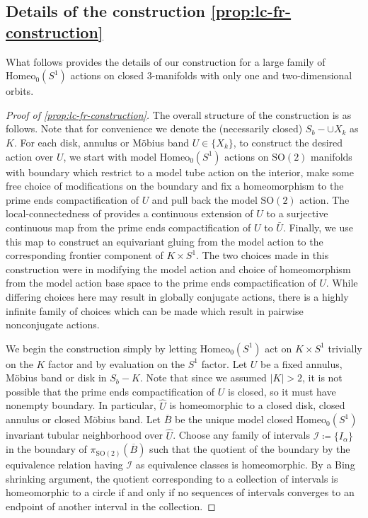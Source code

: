 \documentclass[10pt, oneside]{article}
\newcommand{\SO}[1][2]{\text{SO}(#1)}
\newcommand{\homeo}[1][S^1]{\text{Homeo}_0(#1)}
\newcommand{\cl}[1]{\overline{#1}}
\theoremstyle{definition}
\theoremstyle{definition}
\begin{document}
\subsection{Details of the construction \texorpdfstring{\cref{prop:lc-fr-construction}}{Proposition \ref*{prop:lc-fr-construction}}}\label{subsec:details-of-construction}
What follows provides the details of our construction for a large family of $\homeo$ actions on closed 3-manifolds with only one and two-dimensional orbits.
\begin{proof}[Proof of \cref{prop:lc-fr-construction}]
    The overall structure of the construction is as follows. Note that for convenience we denote the (necessarily closed) $S_b - \cup X_k$ as $K$.
    For each disk, annulus or M\"{o}bius band $U\in\{X_k\}$, to construct the desired action over $U$, we start with model $\homeo$ actions on $\SO$ manifolds with boundary which restrict to a model tube action on the interior, make some free choice of modifications on the boundary and fix a homeomorphism to the prime ends compactification of $U$ and pull back the model $\SO$ action. The local-connectedness of provides a continuous extension of $U$ to a surjective continuous map from the prime ends compactification of $U$ to $\bar{U}$. Finally, we use this map to construct an equivariant gluing from the model action to the corresponding frontier component of $K\times S^1$. The two choices made in this construction were in modifying the model action and choice of homeomorphism from the model action base space to the prime ends compactification of $U$. While differing choices here may result in globally conjugate actions, there is a highly infinite family of choices which can be made which result in pairwise nonconjugate actions.

    We begin the construction simply by letting $\homeo$ act on $K\times S^1$ trivially on the $K$ factor and by evaluation on the $S^1$ factor. Let $U$ be a fixed annulus, M\"{o}bius band or disk in $S_b - K$. Note that since we assumed $\lvert K\rvert > 2$, it is not possible that the prime ends compactification of $U$ is closed, so it must have nonempty boundary. In particular, $\hat{U}$ is homeomorphic to a closed disk, closed annulus or closed M\"{o}bius band. Let $\cl{B}$ be the unique model closed $\homeo$ invariant tubular neighborhood over $\hat{U}$. Choose any family of intervals $\mathscr{I}\coloneqq \{I_\alpha\}$ in the boundary of $\pi_{\SO}(\cl{B})$ such that the quotient of the boundary by the equivalence relation having $\mathscr{I}$ as equivalence classes is homeomorphic. By a Bing shrinking argument, the quotient corresponding to a collection of intervals is homeomorphic to a circle if and only if no sequences of intervals converges to an endpoint of another interval in the collection.


\end{proof}
\end{document}
